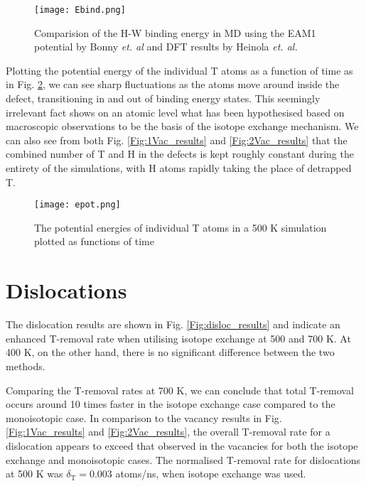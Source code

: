 \begin{figure}[!ht]
	\center
	\texttt{[image: Ebind.png]}
	\caption{Comparision of the H-W binding energy in MD using the EAM1 potential by Bonny \textit{et. al} and DFT results by Heinola \textit{et. al. }\cite{heinolaTungstenDFT}}
	\label{Fig:Ebind1H_DFT}
\end{figure}

Plotting the potential energy of the individual T atoms as a function of time as in Fig. \ref{Fig:Epot}, we can see sharp fluctuations as the atoms move around inside the defect, transitioning in and out of binding energy states.
This seemingly irrelevant fact shows on an atomic level what has been hypothesised based on macroscopic observations to be the basis of the isotope exchange mechanism.
We can also see from both Fig. \ref{Fig:1Vac_results} and \ref{Fig:2Vac_results} that the combined number of T and H in the defects is kept roughly constant during the entirety of the simulations, with H atoms rapidly taking the place of detrapped T.

\begin{figure}[!ht]
	\center
	\texttt{[image: epot.png]}
	\caption{The potential energies of individual T atoms in a 500 K simulation plotted as functions of time\vspace*{6mm}}
	\label{Fig:Epot}
\end{figure}


\section{Dislocations}
The dislocation results are shown in Fig. \ref{Fig:disloc_results} and indicate an enhanced T-removal rate when utilising isotope exchange at 500 and 700 K. 
At 400 K, on the other hand, there is no significant difference between the two methods.

Comparing the T-removal rates at 700 K, we can conclude that total T-removal occurs around 10 times faster in the isotope exchange case compared to the monoisotopic case.
In comparison to the vacancy results in Fig. \ref{Fig:1Vac_results} and \ref{Fig:2Vac_results}, the overall T-removal rate for a dislocation appears to exceed that observed in the vacancies for both the isotope exchange and monoisotopic cases.
The normalised T-removal rate for dislocations at 500 K was $\delta_{\text{T}} = 0.003$ atoms/ns, when isotope exchange was used.

